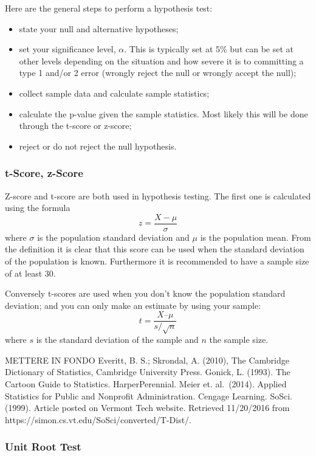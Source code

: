 \documentclass[11pt]{article}
\providecommand{\tightlist}{%
      \setlength{\itemsep}{0pt}\setlength{\parskip}{0pt}}
\begin{document}
Here are the general steps to perform a hypothesis test:

\begin{itemize}
\tightlist
\item
  state your null and alternative hypotheses;
\item
  set your significance level, \(\alpha\). This is typically set at 5\%
  but can be set at other levels depending on the situation and how
  severe it is to committing a type 1 and/or 2 error (wrongly reject the
  null or wrongly accept the null);
\item
  collect sample data and calculate sample statistics;
\item
  calculate the p-value given the sample statistics. Most likely this
  will be done through the t-score or z-score;
\item
  reject or do not reject the null hypothesis.
\end{itemize}

\hypertarget{t-score-z-score}{%
\subsubsection{t-Score, z-Score}\label{t-score-z-score}}

Z-score and t-score are both used in hypothesis testing. The first one
is calculated using the formula \[z = \frac{X-\mu}{\sigma}\] where
\(\sigma\) is the population standard deviation and \(\mu\) is the
population mean. From the definition it is clear that this score can be
used when the standard deviation of the population is known. Furthermore
it is recommended to have a sample size of at least 30.

Conversely t-scores are used when you don't know the population standard
deviation; and you can only make an estimate by using your sample:
\[t = \frac{X – \mu}{s/\sqrt{n}}\] where \(s\) is the standard deviation
of the sample and \(n\) the sample size.

METTERE IN FONDO Everitt, B. S.; Skrondal, A. (2010), The Cambridge
Dictionary of Statistics, Cambridge University Press. Gonick, L. (1993).
The Cartoon Guide to Statistics. HarperPerennial. Meier et. al.~(2014).
Applied Statistics for Public and Nonprofit Administration. Cengage
Learning. SoSci. (1999). Article posted on Vermont Tech website.
Retrieved 11/20/2016 from
https://simon.cs.vt.edu/SoSci/converted/T-Dist/.

\hypertarget{unit-root-test}{%
\subsubsection{Unit Root Test}\label{unit-root-test}}
\end{document}
